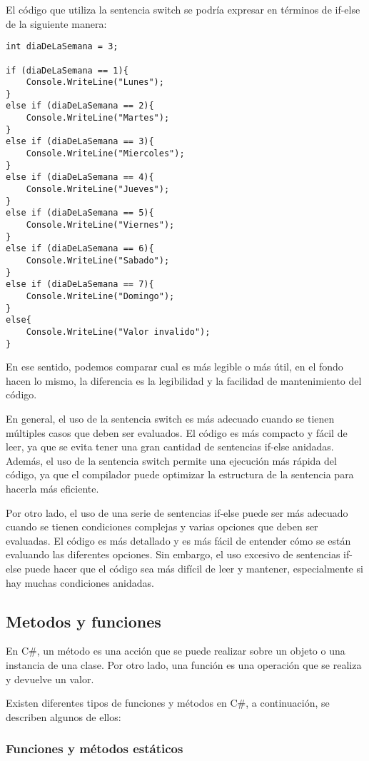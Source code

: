 \documentclass[executivepaper]{article}
\begin{document}
El código que utiliza la sentencia switch se podría expresar en términos de if-else de la siguiente manera:

\begin{lstlisting}
int diaDeLaSemana = 3;

if (diaDeLaSemana == 1){
    Console.WriteLine("Lunes");
}
else if (diaDeLaSemana == 2){
    Console.WriteLine("Martes");
}
else if (diaDeLaSemana == 3){
    Console.WriteLine("Miercoles");
}
else if (diaDeLaSemana == 4){
    Console.WriteLine("Jueves");
}
else if (diaDeLaSemana == 5){
    Console.WriteLine("Viernes");
}
else if (diaDeLaSemana == 6){
    Console.WriteLine("Sabado");
}
else if (diaDeLaSemana == 7){
    Console.WriteLine("Domingo");
}
else{
    Console.WriteLine("Valor invalido");
}
\end{lstlisting}
En ese sentido, podemos comparar cual es más legible o más útil, en el fondo hacen lo mismo, la diferencia es la legibilidad y la facilidad de mantenimiento del código.

En general, el uso de la sentencia switch es más adecuado cuando se tienen múltiples casos que deben ser evaluados. El código es más compacto y fácil de leer, ya que se evita tener una gran cantidad de sentencias if-else anidadas. Además, el uso de la sentencia switch permite una ejecución más rápida del código, ya que el compilador puede optimizar la estructura de la sentencia para hacerla más eficiente.

Por otro lado, el uso de una serie de sentencias if-else puede ser más adecuado cuando se tienen condiciones complejas y varias opciones que deben ser evaluadas. El código es más detallado y es más fácil de entender cómo se están evaluando las diferentes opciones. Sin embargo, el uso excesivo de sentencias if-else puede hacer que el código sea más difícil de leer y mantener, especialmente si hay muchas condiciones anidadas.

\subsection{Metodos y funciones}

En C\#, un método es una acción que se puede realizar sobre un objeto o una instancia de una clase. Por otro lado, una función es una operación que se realiza y devuelve un valor.

Existen diferentes tipos de funciones y métodos en C\#, a continuación, se describen algunos de ellos:

\subsubsection*{Funciones y métodos estáticos}
\end{document}
